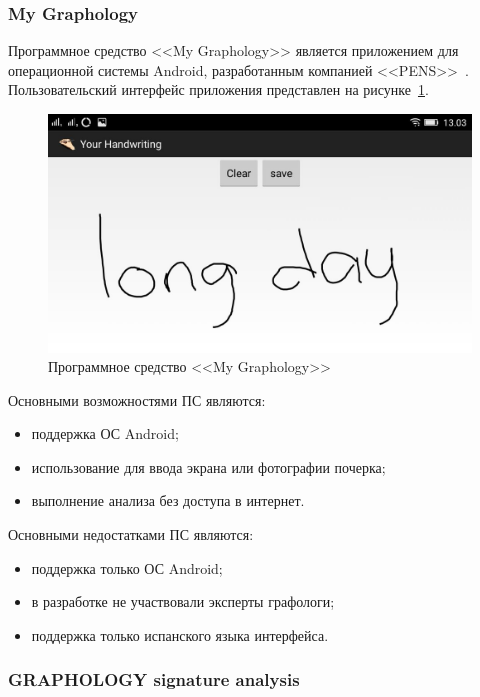 \subsubsection{My Graphology}
\label{sub:domain:analogs:my_graphology}

Программное средство <<My Graphology>> является приложением для операционной системы Android, разработанным компанией <<PENS>>~\cite{analogs_my_graphology}. Пользовательский интерфейс приложения представлен на рисунке~\ref{fig:domain:analogs:my_graphology}.

\begin{figure}[h]
    \centering
    \includegraphics[width=0.4\textheight]{figures/analog_my_graphology.jpeg}
    \caption{Программное средство <<My Graphology>>}
    \label{fig:domain:analogs:my_graphology}
\end{figure}

Основными возможностями ПС являются:
\begin{itemize}
  \item поддержка ОС Android;
  \item использование для ввода экрана или фотографии почерка;
  \item выполнение анализа без доступа в интернет.
\end{itemize}

Основными недостатками ПС являются:
\begin{itemize}
  \item поддержка только ОС Android;
  \item в разработке не участвовали эксперты графологи;
  \item поддержка только испанского языка интерфейса.
\end{itemize}

\subsubsection{GRAPHOLOGY signature analysis}
\label{sub:domain:analogs:graphology_sign_analysis}

